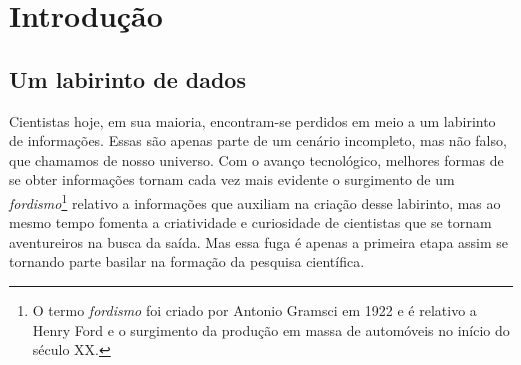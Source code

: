


\chapter{Introdução}
\label{sec:Intro}


\section{Um labirinto de dados}
\label{sec:Intro:LabData}

Cientistas hoje, em sua maioria, encontram-se perdidos em meio a um labirinto
de informações. Essas são apenas parte de um cenário incompleto, mas não falso,
que chamamos de nosso universo. Com o avanço tecnológico, melhores formas de se
obter informações tornam cada vez mais evidente o surgimento de um {\em
fordismo}\footnote{O termo {\em fordismo} foi criado por Antonio Gramsci em 1922
e é relativo a Henry Ford e o surgimento da produção em massa de automóveis no
início do século XX.} relativo a informações que auxiliam na criação desse
labirinto, mas ao mesmo tempo fomenta a criatividade e curiosidade de
cientistas que se tornam aventureiros na busca da saída. Mas essa fuga é apenas
a primeira etapa assim se tornando parte basilar na formação da pesquisa
científica.

